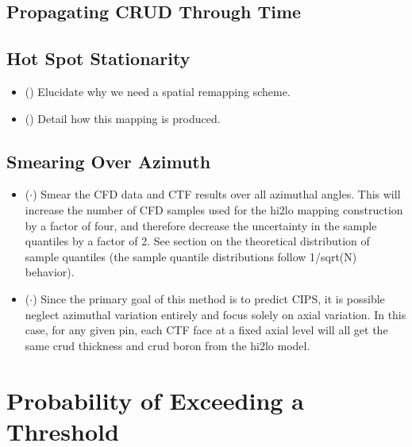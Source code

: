 \subsection{Propagating CRUD Through Time}
\subsection{Hot Spot Stationarity}
\begin{itemize}
        \item (\checkmark) Elucidate why we need a spatial remapping scheme.
        \item (\checkmark) Detail how this mapping is produced.
\end{itemize}

\subsection{Smearing Over Azimuth}

\begin{itemize}
        \item ($\cdot$) Smear the CFD data and CTF results over all azimuthal angles.  This will increase the number of CFD samples used for the hi2lo mapping construction by a factor of four, and therefore decrease the uncertainty in the sample quantiles by a factor of 2.  See section on the theoretical distribution of sample quantiles (the sample quantile distributions follow 1/sqrt(N) behavior).
        \item ($\cdot$) Since the primary goal of this method is to predict CIPS, it is possible neglect azimuthal variation entirely and focus solely on axial variation.  In this case, for any given pin, each CTF face at a fixed axial level will all get the same crud thickness and crud boron from the hi2lo model.
\end{itemize}

\section{Probability of Exceeding a Threshold}

